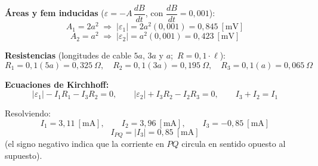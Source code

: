 \documentclass[12pt,letterpaper]{article}
\begin{document}
\medskip
\begin{center}
\end{center}
\medskip

\noindent\textbf{\'Areas y fem inducidas} ($\varepsilon = -A\,\dfrac{dB}{dt}$, con $\dfrac{dB}{dt}=0{,}001$):
\[
    A_1 = 2a^2 \;\Rightarrow\; |\varepsilon_1| = 2a^2(0{,}001) = 0{,}845\ [\text{mV}]
\]
\[
    A_2 = a^2 \;\Rightarrow\; |\varepsilon_2| = a^2(0{,}001) = 0{,}423\ [\text{mV}]
\]

\noindent\textbf{Resistencias} (longitudes de cable $5a$, $3a$ y $a$; $\,R = 0{,}1\cdot\ell$):
\[
    R_1 = 0{,}1(5a) = 0{,}325\ \Omega,\quad
    R_2 = 0{,}1(3a) = 0{,}195\ \Omega,\quad
    R_3 = 0{,}1(a) = 0{,}065\ \Omega
\]

\noindent\textbf{Ecuaciones de Kirchhoff:}
\[
    |\varepsilon_1| - I_1 R_1 - I_3 R_2 = 0,\qquad
    |\varepsilon_2| + I_3 R_2 - I_2 R_3 = 0,\qquad
    I_3 + I_2 = I_1
\]

\noindent Resolviendo:
\[
    I_1 = 3{,}11\ [\text{mA}],\qquad
    I_2 = 3{,}96\ [\text{mA}],\qquad
    I_3 = -0{,}85\ [\text{mA}]
\]
\[
    \boxed{I_{PQ} = |I_3| = 0{,}85\ [\text{mA}]}
\]
(el signo negativo indica que la corriente en $PQ$ circula en sentido opuesto al supuesto).
\end{document}
